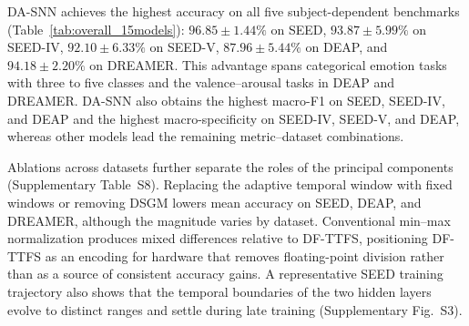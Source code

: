 \documentclass{nsr}
\begin{document}
DA-SNN achieves the highest accuracy on all five subject-dependent benchmarks (Table~\ref{tab:overall_15models}): $96.85 \pm 1.44\%$ on SEED, $93.87 \pm 5.99\%$ on SEED-IV, $92.10 \pm 6.33\%$ on SEED-V, $87.96 \pm 5.44\%$ on DEAP, and $94.18 \pm 2.20\%$ on DREAMER. This advantage spans categorical emotion tasks with three to five classes and the valence--arousal tasks in DEAP and DREAMER. DA-SNN also obtains the highest macro-F1 on SEED, SEED-IV, and DEAP and the highest macro-specificity on SEED-IV, SEED-V, and DEAP, whereas other models lead the remaining metric--dataset combinations.

Ablations across datasets further separate the roles of the principal components (Supplementary Table~S8). Replacing the adaptive temporal window with fixed windows or removing DSGM lowers mean accuracy on SEED, DEAP, and DREAMER, although the magnitude varies by dataset. Conventional min--max normalization produces mixed differences relative to DF-TTFS, positioning DF-TTFS as an encoding for hardware that removes floating-point division rather than as a source of consistent accuracy gains. A representative SEED training trajectory also shows that the temporal boundaries of the two hidden layers evolve to distinct ranges and settle during late training (Supplementary Fig.~S3).
\end{document}
